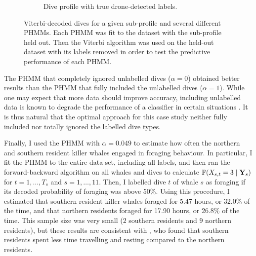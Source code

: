 \begin{figure}
\begin{subfigure}[t]{0.45\textwidth}
        \caption{Dive profile with true drone-detected labels.}
    \end{subfigure}
    \caption{Viterbi-decoded dives for a given sub-profile and several different PHMMs. Each PHMM was fit to the dataset with the sub-profile held out. Then the Viterbi algorithm was used on the held-out dataset with its labels removed in order to test the predictive performance of each PHMM.}
    \label{fig:viterbi_dives_D26b}
\end{figure}

The PHMM that completely ignored unlabelled dives ($\alpha = 0$) obtained better results than the PHMM that fully included the unlabelled dives ($\alpha = 1$). While one may expect that more data should improve accuracy, including unlabelled data is known to degrade the performance of a classifier in certain situations \citep{Singh:2008}. It is thus natural that the optimal approach for this case study neither fully included nor totally ignored the labelled dive types. %


Finally, I used the PHMM with $\alpha = 0.049$ to estimate how often the northern and southern resident killer whales engaged in foraging behaviour. In particular, I fit the PHMM to the entire data set, including all labels, and then ran the forward-backward algorithm on all whales and dives to calculate $\mathbb{P}(X_{s,t} = 3 \mid \mathbf{Y}_s)$ for $t = 1,\ldots,T_s$ and $s = 1,\ldots,11$. Then, I labelled dive $t$ of whale $s$ as foraging if its decoded probability of foraging was above 50\%. Using this procedure, I estimated that southern resident killer whales foraged for 5.47 hours, or 32.0\% of the time, and that northern residents foraged for 17.90 hours, or 26.8\% of the time. This sample size was very small (2 southern residents and 9 northern residents), but these results are consistent with \citet{Tennessen:2023}, who found that southern residents spent less time travelling and resting compared to the northern residents.